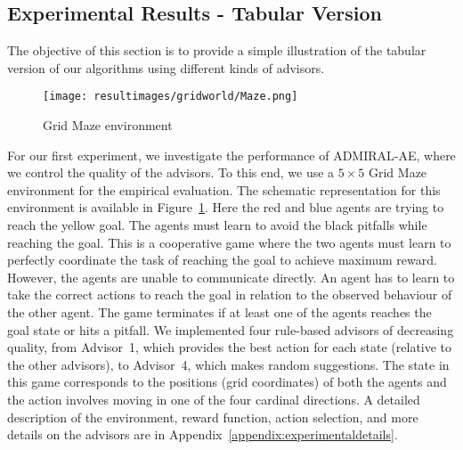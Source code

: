 \documentclass[jair, twoside,11pt,theapa]{article}
\begin{document}
\subsection{Experimental Results - Tabular Version}\label{sec:gridworldappendix}

The objective of this section is to provide a simple illustration of the tabular version of our algorithms using different kinds of advisors. 

\begin{figure}
    \centering
    \texttt{[image: resultimages/gridworld/Maze.png]}
    \caption{Grid Maze environment}
    \label{fig:gridworldenv}
\end{figure}

For our first experiment, we investigate the performance of ADMIRAL-AE, where we control the quality of the advisors. To this end, we use a $5 \times 5$ Grid Maze environment for the empirical evaluation. The schematic representation for this environment is available in Figure~\ref{fig:gridworldenv}. Here the red and blue agents are trying to reach the yellow goal. The agents must learn to avoid the black pitfalls while reaching the goal. This is a cooperative game where the two agents must learn to perfectly coordinate the task of reaching the goal to achieve maximum reward.  However, the agents are unable to communicate directly. An agent has to learn to take the correct actions to reach the goal in relation to the observed behaviour of the other agent. The game terminates if at least one of the agents reaches the goal state or hits a pitfall.  
We implemented four rule-based advisors of decreasing quality, from Advisor~1, which provides the best action for each state (relative to the other advisors), to Advisor~4, which makes random suggestions. The state in this game corresponds to the positions (grid coordinates) of both the agents and the action involves moving in one of the four cardinal directions. A detailed description of the environment, reward function, action selection, and more details on the advisors are in Appendix~\ref{appendix:experimentaldetails}. 
\end{document}

